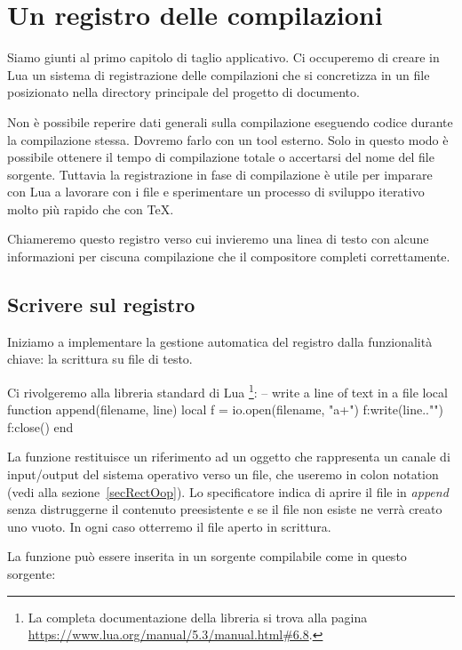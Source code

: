 

\chapter{Un registro delle compilazioni}
\label{iiichRegistro}

Siamo giunti al primo capitolo di taglio applicativo. Ci occuperemo di creare
in Lua un sistema di registrazione delle compilazioni che si concretizza in un
file posizionato nella directory principale del progetto di documento.

Non è possibile reperire dati generali sulla compilazione eseguendo codice
durante la compilazione stessa. Dovremo farlo con un tool esterno. Solo in
questo modo è possibile ottenere il tempo di compilazione totale o accertarsi
del nome del file sorgente. Tuttavia la registrazione in fase di compilazione è
utile per imparare con Lua a lavorare con i file e sperimentare un processo di
sviluppo iterativo molto più rapido che con \TeX.

Chiameremo questo registro  verso cui invieremo una linea di
testo con alcune informazioni per ciscuna compilazione che il compositore
completi correttamente.


\section{Scrivere sul registro}

Iniziamo a implementare la gestione automatica del registro dalla funzionalità
chiave: la scrittura su file di testo.

Ci rivolgeremo alla libreria standard di Lua \footnote{La completa
documentazione della libreria  si trova alla pagina
\url{https://www.lua.org/manual/5.3/manual.html\#6.8}.}:
\lines
-- write a line of text in a file
local function append(filename, line)
    local f = io.open(filename, "a+")
    f:write(line.."\n")
    f:close()
end
\endlines
{}

La funzione  restituisce un riferimento ad un oggetto che
rappresenta un canale di input/output del sistema operativo verso un file, che
useremo in colon notation (vedi alla sezione~\ref{secRectOop}). Lo specificatore
 indica di aprire il file in \emph{append} senza distruggerne il
contenuto preesistente e se il file non esiste ne verrà creato uno vuoto. In
ogni caso otterremo il file aperto in scrittura.

La funzione  può essere inserita in un sorgente \LuaTeX{}
compilabile come in questo sorgente:


